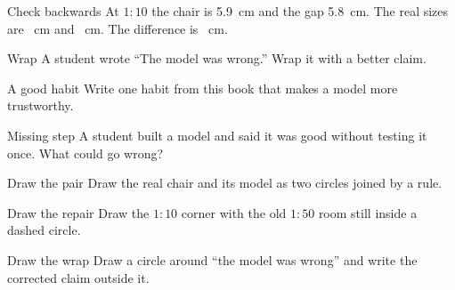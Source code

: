 \clearpage

\begin{puzzle}{Check backwards}
At $1:10$ the chair is 5.9~cm and the gap 5.8~cm. The real sizes are \wline[1.2cm]~cm and \wline[1.2cm]~cm. The difference is \wline[1.2cm]~cm.
\end{puzzle}

\begin{puzzle}{Wrap}
A student wrote ``The model was wrong.'' Wrap it with a better claim. \wline[6cm]
\end{puzzle}

\begin{puzzle}{A good habit}
Write one habit from this book that makes a model more trustworthy. \wline[6cm]
\end{puzzle}

\begin{puzzle}{Missing step}
A student built a model and said it was good without testing it once. What could go wrong? \wline[6cm]
\end{puzzle}

\clearpage

\begin{puzzle}{Draw the pair}
Draw the real chair and its model as two circles joined by a rule.
\begin{center}\end{center}
\end{puzzle}

\begin{puzzle}{Draw the repair}
Draw the $1:10$ corner with the old $1:50$ room still inside a dashed circle.
\begin{center}\end{center}
\end{puzzle}

\begin{puzzle}{Draw the wrap}
Draw a circle around ``the model was wrong'' and write the corrected claim outside it.
\begin{center}\end{center}
\end{puzzle}

